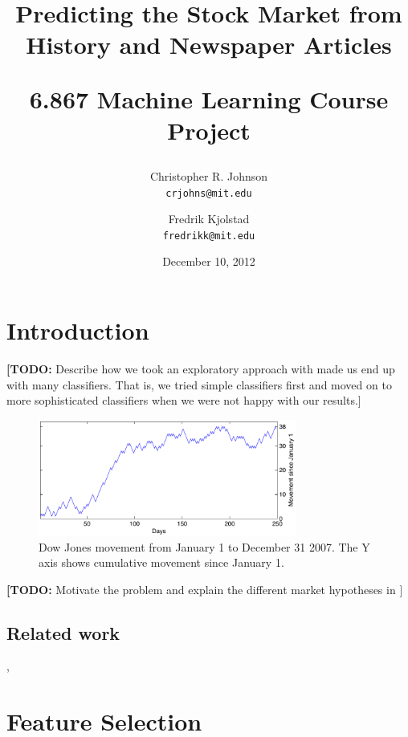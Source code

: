 \documentclass[10pt, twocolumn]{article}
\def\TODO#1{\noindent\textbf{[TODO:} #1]}
\begin{document}
\title{Predicting the Stock Market from History and Newspaper Articles \\ \begin{large}6.867 Machine Learning Course Project\end{large}}

\author{Christopher R. Johnson  \\ \texttt{crjohns@mit.edu} \and Fredrik Kjolstad \\ \texttt{fredrikk@mit.edu}}
\date{December 10, 2012}
\maketitle

\begin{abstract}
\end{abstract}

\section{Introduction}

\TODO{Describe how we took an exploratory approach with made us end up with many classifiers. That is, we tried simple classifiers first and moved on to more sophisticated classifiers when we were not happy with our results.}

\begin{figure}
\includegraphics[width=8.5cm]{experiments/dj_performance.pdf}
\caption{Dow Jones movement from January 1 to December 31 2007. The Y axis shows cumulative movement since January 1.}
\label{fig:dj-preformance}
\end{figure}

\TODO{Motivate the problem and explain the different market hypotheses in \cite{mlstockmarket}}

\subsection{Related work}
\cite{twitter}, \cite{mlstockmarket}

\section{Feature Selection}
\label{sec:features}
\end{document}
